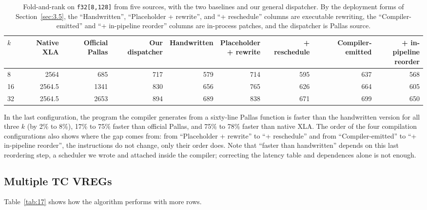 \documentclass[sigconf,nonacm,balance=false]{acmart}
\newcommand{\code}[1]{\texttt{#1}}
\begin{document}
\begin{table}
\centering
\caption{Fold-and-rank on \code{f32[8,\allowbreak{}128]} from five sources, with the two baselines and our general dispatcher. By the deployment forms of Section~\ref{sec:3.5}, the ``Handwritten'', ``Placeholder + rewrite'', and ``+ reschedule'' columns are executable rewriting, the ``Compiler-emitted'' and ``+ in-pipeline reorder'' columns are in-process patches, and the dispatcher is Pallas source.}
\label{tab:16}
\begin{tabular}{lrrrrrrrr}
\toprule
$k$ & Native XLA & Official Pallas & Our dispatcher & Handwritten & \makecell[rb]{Placeholder\\+ rewrite} & + reschedule & Compiler-emitted & \makecell[rb]{+ in-pipeline\\reorder} \\
\midrule
8 & 2564 & 685 & 717 & 579 & 714 & 595 & 637 & 568 \\
16 & 2564.5 & 1341 & 830 & 656 & 765 & 626 & 664 & 605 \\
32 & 2564.5 & 2653 & 894 & 689 & 838 & 671 & 699 & 650 \\
\bottomrule
\end{tabular}
\end{table}

In the last configuration, the program the compiler generates from a sixty-line Pallas function is faster than the handwritten version for all three $k$ (by 2\% to 8\%), 17\% to 75\% faster than official Pallas, and 75\% to 78\% faster than native XLA. The order of the four compilation configurations also shows where the gap comes from: from ``Placeholder + rewrite'' to ``+ reschedule'' and from ``Compiler-emitted'' to ``+ in-pipeline reorder'', the instructions do not change, only their order does. Note that ``faster than handwritten'' depends on this last reordering step, a scheduler we wrote and attached inside the compiler; correcting the latency table and dependences alone is not enough.

\subsection{Multiple TC VREGs}
\label{sec:7.4}

Table~\ref{tab:17} shows how the algorithm performs with more rows.
\end{document}
